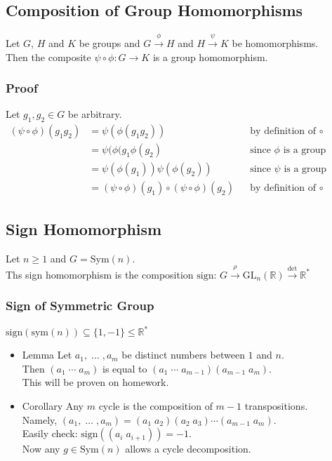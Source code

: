 \documentclass[11pt]{article}
\newcommand{\0}{\emptyset}
\newcommand{\R}{\mathbb{R}}
\begin{document}
\subsection*{Composition of Group Homomorphisms}
\label{sec:orga298b52}
Let \(G\), \(H\) and \(K\) be groups and \(G\overset{\phi}{\to}H\) and \(H\overset{\psi}{\to}K\) be homomorphisms.\\[0pt]
Then the composite \(\psi\circ\phi:G\to K\) is a group homomorphism.\\[0pt]
\subsubsection*{Proof}
\label{sec:orgc177e0b}
Let \(g_{1},g_{2}\in G\) be arbitrary.\\[0pt]
\begin{align*}
  (\psi\circ\phi)(g_{1}g_{2})
  &=\psi(\phi(g_{1}g_{2})) && \text{by definition of }\circ
  \\&=\psi(\phi(g_{1}\phi(g_{2}) && \text{since $\phi$ is a group homomorphism}
  \\&=\psi(\phi(g_{1}))\psi(\phi(g_{2})) && \text{since $\psi$ is a group homomorphism}
  \\&=(\psi\circ\phi)(g_{1})\circ(\psi\circ\phi)(g_{2}) && \text{by definition of }\circ
\end{align*}
\subsection*{Sign Homomorphism}
\label{sec:org8c44ec2}
Let \(n\geq1\) and \(G=\text{Sym}(n)\).\\[0pt]
Ths sign homomorphism is the composition \(\text{sign: }G\overset{\rho}{\to}\text{GL}_{n}(\R)\overset{\det}{\to}\R^{*}\)\\[0pt]
\subsubsection*{Sign of Symmetric Group}
\label{sec:org9004bdc}
\(\text{sign}(\text{sym}(n))\subseteq\{1,-1\}\leq\R^{*}\)\\[0pt]
\begin{itemize}
\item Lemma
\label{sec:org24741ee}
Let \(a_{1},\;\ldots\;,a_{m}\) be distinct numbers between \(1\) and \(n\).\\[0pt]
Then \((a_{1}\;\cdots\;a_{m})\) is equal to \((a_{1}\;\cdots\;a_{m-1})(a_{m-1}\;a_{m})\).\\[0pt]
This will be proven on homework.\\[0pt]
\item Corollary
\label{sec:orgf4e1d96}
Any \(m\) cycle is the composition of \(m-1\) transpositions.\\[0pt]
Namely, \((a_{1},\;\ldots\;,a_{m})=(a_{1}\;a_{2})(a_{2}\;a_{3})\cdots(a_{m-1}\;a_{m})\).\\[0pt]
Easily check: \(\text{sign}((a_{i}\;a_{i+1}))=-1\).\\[0pt]
Now any \(g\in\text{Sym}(n)\) allows a cycle decomposition.\\[0pt]
\end{itemize}
\end{document}
